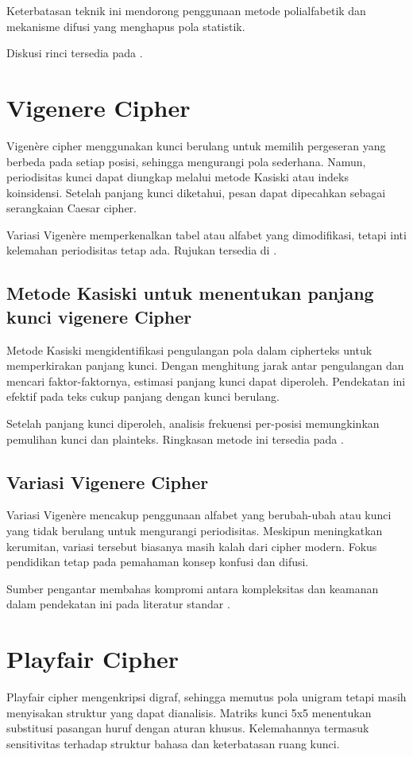 \documentclass[../main.tex]{subfiles}
\begin{document}
Keterbatasan teknik ini mendorong penggunaan metode polialfabetik dan mekanisme difusi yang menghapus pola statistik.

Diskusi rinci tersedia pada \textcite{menezes1996handbook}.

\section{Vigenere Cipher}
Vigenère cipher menggunakan kunci berulang untuk memilih pergeseran yang berbeda pada setiap posisi, sehingga mengurangi pola sederhana. Namun, periodisitas kunci dapat diungkap melalui metode Kasiski atau indeks koinsidensi. Setelah panjang kunci diketahui, pesan dapat dipecahkan sebagai serangkaian Caesar cipher.

Variasi Vigenère memperkenalkan tabel atau alfabet yang dimodifikasi, tetapi inti kelemahan periodisitas tetap ada. Rujukan tersedia di \textcite{menezes1996handbook}.

\subsection{Metode Kasiski untuk menentukan panjang kunci vigenere Cipher}
Metode Kasiski mengidentifikasi pengulangan pola dalam cipherteks untuk memperkirakan panjang kunci. Dengan menghitung jarak antar pengulangan dan mencari faktor-faktornya, estimasi panjang kunci dapat diperoleh. Pendekatan ini efektif pada teks cukup panjang dengan kunci berulang.

Setelah panjang kunci diperoleh, analisis frekuensi per-posisi memungkinkan pemulihan kunci dan plainteks. Ringkasan metode ini tersedia pada \textcite{menezes1996handbook}.

\subsection{Variasi Vigenere Cipher}
Variasi Vigenère mencakup penggunaan alfabet yang berubah-ubah atau kunci yang tidak berulang untuk mengurangi periodisitas. Meskipun meningkatkan kerumitan, variasi tersebut biasanya masih kalah dari cipher modern. Fokus pendidikan tetap pada pemahaman konsep konfusi dan difusi.

Sumber pengantar membahas kompromi antara kompleksitas dan keamanan dalam pendekatan ini pada literatur standar \parencite{menezes1996handbook}.

\section{Playfair Cipher}
Playfair cipher mengenkripsi digraf, sehingga memutus pola unigram tetapi masih menyisakan struktur yang dapat dianalisis. Matriks kunci 5x5 menentukan substitusi pasangan huruf dengan aturan khusus. Kelemahannya termasuk sensitivitas terhadap struktur bahasa dan keterbatasan ruang kunci.
\end{document}
